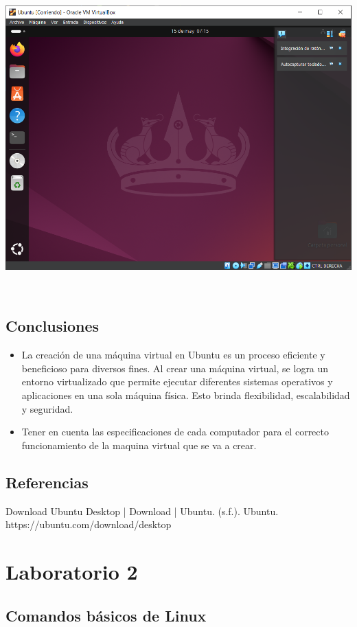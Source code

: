 \documentclass[11pt,twoside]{book}
\begin{document}
\begin{enumerate}
\begin{enumerate}
    \begin{minipage}{\linewidth}
        \centering
        \includegraphics[width=0.4\linewidth]{Ubt.png}
        \label{fig:etiqueta}
    \end{minipage}\\
    


\end{enumerate}

\subsection*{Conclusiones}
\begin{itemize}
  \item La creación de una máquina virtual en Ubuntu es un proceso eficiente y beneficioso para diversos fines. Al crear una máquina virtual, se logra un entorno virtualizado que permite ejecutar diferentes sistemas operativos y aplicaciones en una sola máquina física. Esto brinda flexibilidad, escalabilidad y seguridad.
  \item Tener en cuenta las especificaciones de cada computador para el correcto funcionamiento de la maquina virtual que se va a crear.
\end{itemize}

\subsection*{Referencias}
Download Ubuntu Desktop | Download | Ubuntu. (s.f.). Ubuntu. https://ubuntu.com/download/desktop 
\end{enumerate}

\section{Laboratorio 2}
\subsection{Comandos básicos de Linux}
\end{document}
